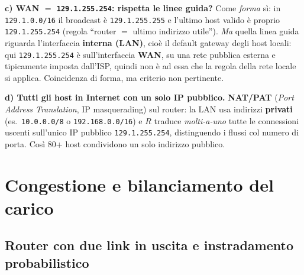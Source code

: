 \documentclass{report}
\begin{document}
\begin{solution}
\medskip
\noindent\textbf{c) WAN $=$ \texttt{129.1.255.254}: rispetta le linee guida?}
Come \emph{forma} sì: in \texttt{129.1.0.0/16} il broadcast è \texttt{129.1.255.255}
e l'ultimo host valido è proprio \texttt{129.1.255.254} (regola ``router $=$ ultimo
indirizzo utile''). \emph{Ma} quella linea guida riguarda l'interfaccia
\textbf{interna (LAN)}, cioè il default gateway degli host locali: qui
\texttt{129.1.255.254} è sull'interfaccia \textbf{WAN}, su una rete pubblica esterna
e tipicamente imposta dall'ISP, quindi non è ad essa che la regola della rete
locale si applica. Coincidenza di forma, ma criterio non pertinente.

\medskip
\noindent\textbf{d) Tutti gli host in Internet con un solo IP pubblico.}
\textbf{NAT/PAT} (\emph{Port Address Translation}, IP masquerading) sul router: la
LAN usa indirizzi \textbf{privati} (es.\ \texttt{10.0.0.0/8} o
\texttt{192.168.0.0/16}) e $R$ traduce \emph{molti-a-uno} tutte le connessioni
uscenti sull'unico IP pubblico \texttt{129.1.255.254}, distinguendo i flussi col
numero di porta. Così 80+ host condividono un solo indirizzo pubblico.
\end{solution}



\chapter{Congestione e bilanciamento del carico}

\section{Router con due link in uscita e instradamento probabilistico}
\end{document}
